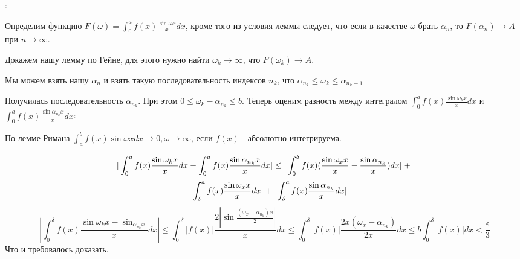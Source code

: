 \documentclass[12pt]{article}
\begin{document}
:\par
Определим функцию $F(\omega) = \int_0^a f(x) \frac{\sin{\omega x}}{x} dx$, кроме того из условия леммы следует, что если в качестве $\omega$ брать $\alpha_n$, то $F(\alpha_n) \to A$ при $n\to\infty$.\par
Докажем нашу лемму по Гейне, для этого нужно найти $\omega_k \to \infty$, что $F(\omega_k) \to A$.\par
Мы можем взять нашу $\alpha_n$ и взять такую последовательность индексов $n_k$, что $\alpha_{n_k} \leq \omega_k \leq \alpha_{n_k + 1}$\par
Получилась последовательность $\alpha_{n_k}$. При этом $0 \leq \omega_k - \alpha_{n_k} \leq b$. Теперь оценим разность между интегралом $\int_0^a f(x) \frac{\sin{\omega_k x}}{x} dx$ и $\int_0^a f(x) \frac{\sin{\alpha_{n_k} x}}{x} dx$:\par
По лемме Римана $\int_a^b f(x) \sin{\omega x} dx \to 0, \omega \to \infty$, если $f(x)$ - абсолютно интегрируема.\par
$$|\int_0^a f(x) \frac{\sin{\omega_k x}}{x} dx - \int_0^a f(x) \frac{\sin{\alpha_{n_k} x}}{x} dx| \leq |\int_0^{\delta} f(x) (\frac{\sin{\omega_x x}}{x} - \frac{\sin{\alpha_{n_k}}}{x}) dx| +\\$$
$$+ |\int_{\delta}^a f(x) \frac{\sin{\omega_x x}}{x} dx| + |\int_{\delta}^a f(x) \frac{\sin{\alpha_{n_k}}}{x} dx|\\$$
$$|\int_0^{\delta} f(x) \frac{\sin{\omega_k x} - \sin_{\alpha_{n_k} x}}{x} dx| \leq \int_0^{\delta} |f(x)| \frac{2|\sin{\frac{(\omega_x - \alpha_{n_k})x}{2}}|}{x} dx \leq \int_0^{\delta} |f(x)| \frac{2x(\omega_x - \alpha_{n_k})}{2x} dx \leq b \int_0^{\delta} |f(x)| dx < \frac{\varepsilon}{3}$$
Что и требовалось доказать.\par
\end{document}
